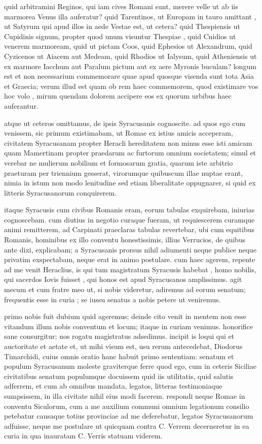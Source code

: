  quid arbitramini Reginos, qui iam cives Romani sunt, merere velle ut ab iis marmorea Venus illa auferatur? quid Tarentinos, ut Europam in tauro amittant , ut Satyrum qui apud illos in aede Vestae est, ut cetera? quid Thespiensis ut Cupidinis signum, propter quod unum visuntur Thespiae , quid Cnidios ut venerem marmoream, quid ut pictam Coos, quid Ephesios ut Alexandrum, quid Cyzicenos ut Aiacem aut Medeam, quid Rhodios ut Ialysum, quid Atheniensis ut ex marmore Iacchum aut Paralum pictum aut ex aere Myronis buculam? longum est et non necessarium commemorare quae apud quosque visenda sunt tota Asia et Graecia; verum illud est quam ob rem haec commemorem, quod existimare vos hoc volo , mirum quendam dolorem accipere eos ex quorum urbibus haec auferantur.

 atque ut ceteros omittamus, de ipsis Syracusanis cognoscite. ad quos ego cum venissem, sic primum existimabam, ut Romae ex istius amicis acceperam, civitatem Syracusanam propter Heracli hereditatem non minus esse isti amicam quam Mamertinam propter praedarum ac furtorum omnium societatem; simul et verebar ne mulierum nobilium et formosarum gratia, quarum iste arbitrio praeturam per triennium gesserat, virorumque quibuscum illae nuptae erant, nimia in istum non modo lenitudine sed etiam liberalitate oppugnarer, si quid ex litteris Syracusanorum conquirerem.

 itaque Syracusis cum civibus Romanis eram, eorum tabulas exquirebam, iniurias cognoscebam. cum diutius in negotio curaque fueram, ut requiescerem curamque animi remitterem, ad Carpinati praeclaras tabulas revertebar, ubi cum equitibus Romanis, hominibus ex illo conventu honestissimis, illius Verrucios, de quibus ante dixi, explicabam; a Syracusanis prorsus nihil adiumenti neque publice neque privatim exspectabam, neque erat in animo postulare. cum haec agerem, repente ad me venit Heraclius, is qui tum magistratum Syracusis habebat , homo nobilis, qui sacerdos Iovis fuisset , qui honos est apud Syracusanos amplissimus. agit mecum et cum fratre meo ut, si nobis videretur, adiremus ad eorum senatum; frequentis esse in curia ; se iussu senatus a nobis petere ut veniremus.

 primo nobis fuit dubium quid ageremus; deinde cito venit in mentem non esse vitandum illum nobis conventum et locum; itaque in curiam venimus. honorifice sane consurgitur; nos rogatu magistratus adsedimus. incipit is loqui qui et auctoritate et aetate et, ut mihi visum est, usu rerum antecedebat, Diodorus Timarchidi, cuius omnis oratio hanc habuit primo sententiam: senatum et populum Syracusanum moleste graviterque ferre quod ego, cum in ceteris Siciliae civitatibus senatum populumque docuissem quid iis utilitatis, quid salutis adferrem, et cum ab omnibus mandata, legatos, litteras testimoniaque sumpsissem, in illa civitate nihil eius modi facerem. respondi neque Romae in conventu Siculorum, cum a me auxilium communi omnium legationum consilio petebatur causaque totius provinciae ad me deferebatur, legatos Syracusanorum adfuisse, neque me postulare ut quicquam contra C. Verrem decerneretur in ea curia in qua inauratam C. Verris statuam viderem.

